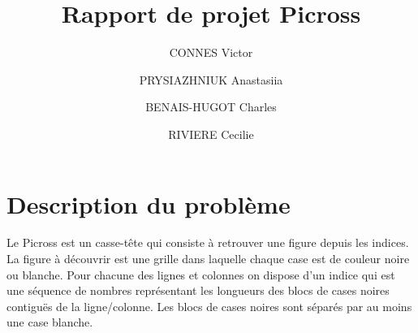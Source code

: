 \documentclass{article}
\begin{document}
\title{Rapport de projet Picross}
\author{CONNES Victor \and PRYSIAZHNIUK Anastasiia \and BENAIS-HUGOT Charles \and RIVIERE Cecilie}
\maketitle
\tableofcontents 
\newpage
\section{Description du problème}

Le Picross est un casse-tête qui consiste à retrouver une figure depuis les indices. La figure à découvrir est une grille dans laquelle chaque case est de couleur noire ou blanche. Pour chacune des lignes et colonnes on dispose d'un indice qui est une séquence de nombres représentant les longueurs des blocs de cases noires contiguës de la ligne/colonne. Les blocs de cases noires sont séparés par au moins une case blanche.
\end{document}
